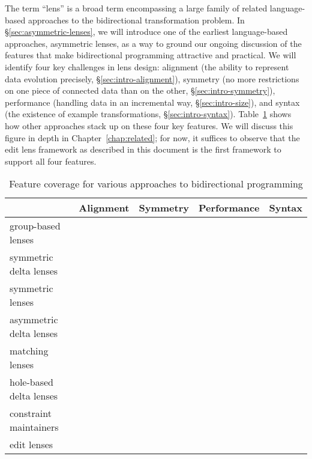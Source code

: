 The term ``lens'' is a broad term encompassing a large family of related
language-based approaches to the bidirectional transformation problem.
In \S\ref{sec:asymmetric-lenses}, we will introduce one of the earliest
language-based approaches, asymmetric lenses, as a way to ground our ongoing
discussion of the features that make bidirectional programming attractive
and practical. We will identify four key challenges in lens design:
alignment (the ability to represent data evolution precisely,
\S\ref{sec:intro-alignment}), symmetry (no more restrictions on one piece of
connected data than on the other, \S\ref{sec:intro-symmetry}), performance
(handling data in an incremental way, \S\ref{sec:intro-size}), and syntax
(the existence of example transformations, \S\ref{sec:intro-syntax}).
Table~\ref{tab:related-work-matrix} shows how other approaches stack up on
these four key features. We will discuss this figure in depth in
Chapter~\ref{chap:related}; for now, it suffices to observe that the edit
lens framework as described in this document is the first framework to
support all four features.

\begin{table}
    \begin{center}
    \begin{tabular}{l|cccc}
        & Alignment & Symmetry & Performance & Syntax \\
        \hline
        group-based lenses      &\Y&\N&\N&\N\\
        symmetric delta lenses  &\Y&\Y&\N&\N\\
        symmetric lenses        &\N&\Y&\N&\Y\\
        asymmetric delta lenses &\Y&\N&\N&\Y\\
        matching lenses         &\Y&\N&\N&\Y\\
        hole-based delta lenses &\Y&\N&\N&\Y\\
        constraint maintainers  &\Y&\Y&\N&\Y\\
        edit lenses             &\Y&\Y&\Y&\Y\\
    \end{tabular}
    \end{center}
    \caption{Feature coverage for various approaches to bidirectional
    programming}
    \label{tab:related-work-matrix}
\end{table}

